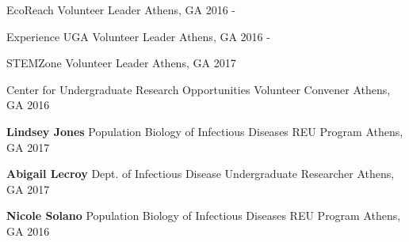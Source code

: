 

\begin{cvhonors}


    \cvhonor
      {EcoReach}
      {Volunteer Leader}
      {Athens, GA}
      {2016 - }

    \cvhonor
      {Experience UGA}
      {Volunteer Leader}
      {Athens, GA}
      {2016 - }

    \cvhonor
      {STEMZone}
      {Volunteer Leader}
      {Athens, GA}
      {2017}

    \cvhonor
      {Center for Undergraduate Research Opportunities} %
      {Volunteer Convener} %
      {Athens, GA} %
      {2016} %
\end{cvhonors}

\begin{cvhonors}

  \cvhonor
    {\textbf{Lindsey Jones}} %
    {Population Biology of Infectious Diseases REU Program} %
    {Athens, GA} %
    {2017} %

  \cvhonor
    {\textbf{Abigail Lecroy}} %
    {Dept. of Infectious Disease Undergraduate Researcher} %
    {Athens, GA} %
    {2017} %

  \cvhonor
    {\textbf{Nicole Solano}} %
    {Population Biology of Infectious Diseases REU Program} %
    {Athens, GA} %
    {2016} %

\end{cvhonors}
